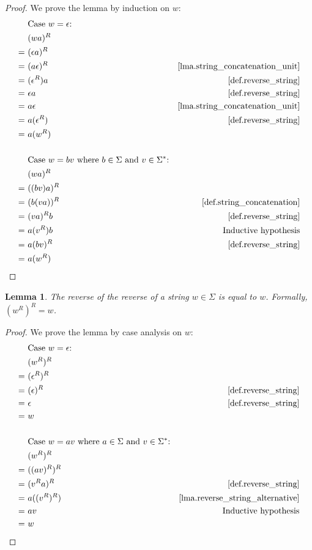 \documentclass{report}
\newtheorem{lemma}[theorem]{Lemma}
\theoremstyle{definition}
\begin{document}
\begin{appendices}
\begin{proof}
We prove the lemma by induction on $w$:
\begin{align*}
& \text{Case } w = \epsilon \text{:} \\
& (wa)^R \\
= \ & (\epsilon a)^R \\
= \ & (a \epsilon)^R
& \text{\cref{lma.string_concatenation_unit}} \\
= \ & (\epsilon^R) a
& \text{\cref{def.reverse_string}} \\
= \ & \epsilon a
& \text{\cref{def.reverse_string}} \\
= \ & a \epsilon
& \text{\cref{lma.string_concatenation_unit}} \\
= \ & a (\epsilon^R)
& \text{\cref{def.reverse_string}} \\
= \ & a (w^R) \\
\\
& \text{Case } w = bv \text{ where } b \in \Sigma \text{ and }
v \in \Sigma^{\ast} \text{:} \\
& (wa)^R \\
= \ & ((bv)a)^R \\
= \ & (b(va))^R
& \text{\cref{def.string_concatenation}} \\
= \ & (va)^R b
& \text{\cref{def.reverse_string}} \\
= \ & a (v^R) b
& \text{Inductive hypothesis} \\
= \ & a (bv)^R
& \text{\cref{def.reverse_string}} \\
= \ & a (w^R)
\end{align*}
\end{proof}

\begin{lemma} \label{lma.reverse_reverse_string}
The reverse of the reverse of a string $w \in \Sigma$ is equal to $w$.
Formally, $(w^R)^R = w$.
\end{lemma}

\begin{proof}
We prove the lemma by case analysis on $w$:
\begin{align*}
& \text{Case } w = \epsilon \text{:} \\
& (w^R)^R \\
= \ & (\epsilon^R)^R \\
= \ & (\epsilon)^R
& \text{\cref{def.reverse_string}} \\
= \ & \epsilon
& \text{\cref{def.reverse_string}} \\
= \ & w \\
\\
& \text{Case } w = av \text{ where } a \in \Sigma \text{ and }
v \in \Sigma^{\ast} \text{:} \\
& (w^R)^R \\
= \ & ((av)^R)^R \\
= \ & (v^R a)^R
& \text{\cref{def.reverse_string}} \\
= \ & a ((v^R)^R)
& \text{\cref{lma.reverse_string_alternative}} \\
= \ & av
& \text{Inductive hypothesis} \\
= \ & w
\end{align*}
\end{proof}


\end{appendices}
\end{document}
